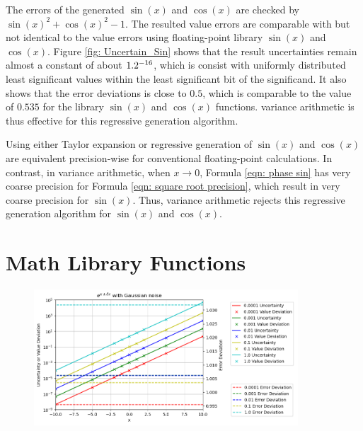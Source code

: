 \documentclass[twoside]{article}
\numberwithin{equation}{section}
\begin{document}
The errors of the generated $\sin(x)$ and $\cos(x)$ are checked by $\sin(x)^2 + \cos(x)^2 - 1$.
The resulted value errors are comparable with but not identical to the value errors using floating-point library $\sin(x)$ and $\cos(x)$.
Figure \ref{fig: Uncertain_Sin} shows that the result uncertainties remain almost a constant of about $1.2 \time 10^{-16}$, which is consist with uniformly distributed least significant values within the least significant bit of the significand.
It also shows that the error deviations is close to $0.5$, which is comparable to the value of $0.535$ for the library $\sin(x)$ and $\cos(x)$ functions.
variance arithmetic is thus effective for this regressive generation algorithm.

Using either Taylor expansion or regressive generation of $\sin(x)$ and $\cos(x)$ are equivalent precision-wise for conventional floating-point calculations.
In contrast, in variance arithmetic, when $x \rightarrow 0$, Formula \eqref{eqn: phase sin} has very coarse precision for Formula \ref{eqn: square root precision}, which result in very coarse precision for $\sin(x)$. 
Thus, variance arithmetic rejects this regressive generation algorithm for $\sin(x)$ and $\cos(x)$.




\clearpage
\section{Math Library Functions}
\label{sec: Math Library}

\begin{figure}[p]
\centering
\includegraphics[height=2in]{Exp_Dev.png} 
\label{fig: Exp_Dev}
\end{figure}
\end{document}
